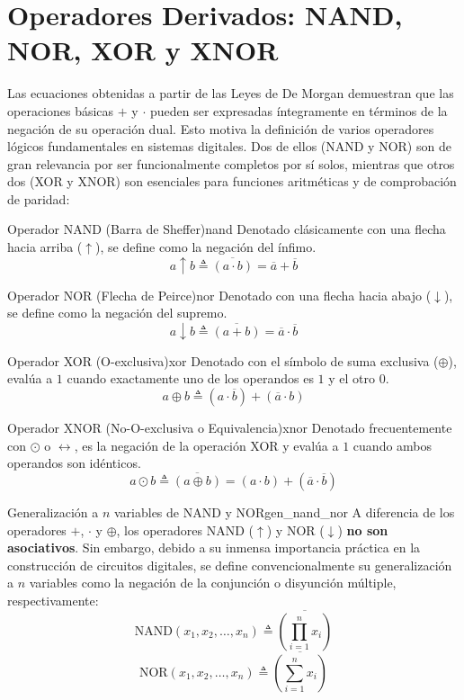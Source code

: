 \chapter{Operadores Derivados: NAND, NOR, XOR y XNOR}
Las ecuaciones obtenidas a partir de las Leyes de De Morgan demuestran que las operaciones básicas $+$ y $\cdot$ pueden ser expresadas íntegramente en términos de la negación de su operación dual. Esto motiva la definición de varios operadores lógicos fundamentales en sistemas digitales. Dos de ellos (NAND y NOR) son de gran relevancia por ser funcionalmente completos por sí solos, mientras que otros dos (XOR y XNOR) son esenciales para funciones aritméticas y de comprobación de paridad:

\begin{definicion}{Operador NAND (Barra de Sheffer)}{nand}
Denotado clásicamente con una flecha hacia arriba ($\uparrow$), se define como la negación del ínfimo.
\[ a \uparrow b \triangleq \overline{(a \cdot b)} = \overline{a} + \overline{b} \]
\end{definicion}

\begin{definicion}{Operador NOR (Flecha de Peirce)}{nor}
Denotado con una flecha hacia abajo ($\downarrow$), se define como la negación del supremo.
\[ a \downarrow b \triangleq \overline{(a + b)} = \overline{a} \cdot \overline{b} \]
\end{definicion}

\begin{definicion}{Operador XOR (O-exclusiva)}{xor}
Denotado con el símbolo de suma exclusiva ($\oplus$), evalúa a $1$ cuando exactamente uno de los operandos es $1$ y el otro $0$.
\[ a \oplus b \triangleq (a \cdot \overline{b}) + (\overline{a} \cdot b) \]
\end{definicion}

\begin{definicion}{Operador XNOR (No-O-exclusiva o Equivalencia)}{xnor}
Denotado frecuentemente con $\odot$ o $\leftrightarrow$, es la negación de la operación XOR y evalúa a $1$ cuando ambos operandos son idénticos.
\[ a \odot b \triangleq \overline{(a \oplus b)} = (a \cdot b) + (\overline{a} \cdot \overline{b}) \]
\end{definicion}

\begin{definicion}{Generalización a $n$ variables de NAND y NOR}{gen_nand_nor}
A diferencia de los operadores $+$, $\cdot$ y $\oplus$, los operadores NAND ($\uparrow$) y NOR ($\downarrow$) \textbf{no son asociativos}. Sin embargo, debido a su inmensa importancia práctica en la construcción de circuitos digitales, se define convencionalmente su generalización a $n$ variables como la negación de la conjunción o disyunción múltiple, respectivamente:
\[ \text{NAND}(x_1, x_2, \dots, x_n) \triangleq \overline{\left( \prod_{i=1}^n x_i \right)} \]
\[ \text{NOR}(x_1, x_2, \dots, x_n) \triangleq \overline{\left( \sum_{i=1}^n x_i \right)} \]
\end{definicion}

